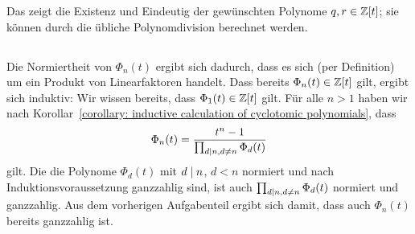 Das zeigt die Existenz und Eindeutig der gewünschten Polynome $q, r \in \mathbb{Z}[t]$;
sie können durch die übliche Polynomdivision berechnet werden.





\subsection{}

Die Normiertheit von $\Phi_n(t)$ ergibt sich dadurch, dass es sich (per Definition) um ein Produkt von Linearfaktoren handelt.
Dass bereits $\Phi_n(t) \in \mathbb{Z}[t]$ gilt, ergibt sich induktiv:
Wir wissen bereits, dass $\Phi_1(t) \in \mathbb{Z}[t]$ gilt.
Für alle $n > 1$ haben wir nach Korollar~\ref{corollary: inductive calculation of cyclotomic polynomials}, dass
\[
    \Phi_n(t)
  = \frac{t^n - 1}{\prod_{d \mathrel{|} n, d \neq n} \Phi_d(t)}
\]
gilt.
Die die Polynome $\Phi_d(t)$ mit $d \mathrel{|} n$, $d < n$ normiert und nach Induktionsvoraussetzung ganzzahlig sind, ist auch $\prod_{d \mathrel{|} n, d \neq n} \Phi_d(t)$ normiert und ganzzahlig.
Aus dem vorherigen Aufgabenteil ergibt sich damit, dass auch $\Phi_n(t)$ bereits ganzzahlig ist.




